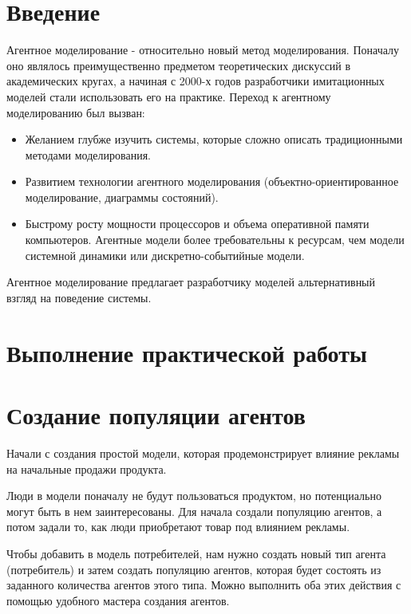 \graphicspath{{./img/}} %

\section*{\LARGE Введение}
Агентное моделирование - относительно новый метод моделирования.
Поначалу оно являлось преимущественно предметом теоретических дискуссий в
академических кругах, а начиная с 2000-х годов разработчики имитационных
моделей стали использовать его на практике.
Переход к агентному моделированию был вызван:

\begin{itemize}
	\item Желанием глубже изучить системы, которые сложно описать
		традиционными методами моделирования.
	\item Развитием технологии агентного моделирования
		(объектно-ориентированное моделирование, диаграммы состояний).
	\item Быстрому росту мощности процессоров и объема оперативной памяти
		компьютеров. Агентные модели более требовательны к ресурсам, чем
		модели системной динамики или дискретно-событийные модели.
\end{itemize}

Агентное моделирование предлагает разработчику моделей альтернативный
взгляд на поведение системы.

\clearpage

\section*{\LARGE Выполнение практической работы}

\section{Создание популяции агентов}
Начали с создания простой модели, которая продемонстрирует влияние
рекламы на начальные продажи продукта.\par
Люди в модели поначалу не будут пользоваться продуктом, но
потенциально могут быть в нем заинтересованы. Для начала создали
популяцию агентов, а потом задали то, как люди приобретают товар под
влиянием рекламы.\par
Чтобы добавить в модель потребителей, нам нужно создать новый тип
агента (потребитель) и затем создать популяцию агентов, которая будет состоять
из заданного количества агентов этого типа. Можно выполнить оба этих
действия с помощью удобного мастера создания агентов.\par

